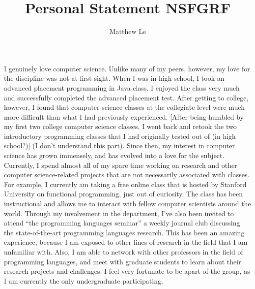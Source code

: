 \documentclass[a4paper,12pt]{article}
\title{Personal Statement NSFGRF}
\author{Matthew Le}
\begin{document}
\maketitle

I genuinely love computer science. Unlike many of my peers, however, my love for the discipline was not at first sight. When I was in high school, I took an advanced placement programming in Java class. I enjoyed the class very much and successfully completed the advanced placement test. After getting to college, however, I found that computer science classes at the collegiate level were much more difficult than what I had previously experienced. [After being humbled by my first two college computer science classes, I went back and retook the two introductory programming classes that I had originally tested out of (in high school?)] (I don't understand this part). Since then, my interest in computer science has grown immensely, and has evolved into a love for the subject. Currently, I spend almost all of my spare time working on research and other computer science-related projects that are not necessarily associated with classes. For example, I currently am taking a free online class that is hosted by Stanford University on functional programming, just out of curiosity. The class has been instructional and allows me to interact with fellow computer scientists around the world. Through my involvement in the department, I've also been invited to attend ``the programming languages seminar'' a weekly journal club discussing the state-of-the-art programming languages research. This has been an amazing experience, because I am exposed to other lines of research in the field that I am unfamiliar with. Also, I am able to network with other professors in the field of programming languages, and meet with graduate students to learn about their research projects and challenges. I feel very fortunate to be apart of the group, as I am currently the only undergraduate participating.  
\end{document}
